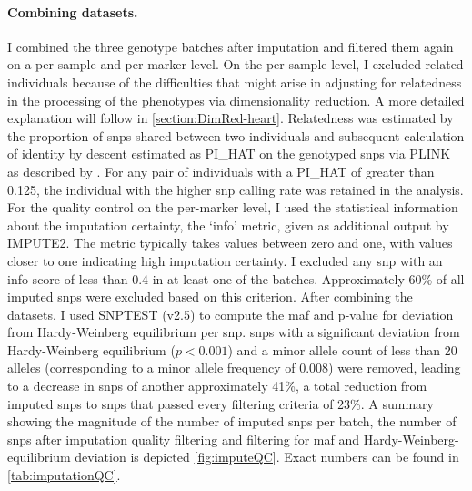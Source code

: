 \paragraph{Combining datasets.} I combined the three genotype batches after imputation and filtered them again on a per-sample and per-marker level. On the per-sample level, I excluded related individuals because of the difficulties that might arise in adjusting for relatedness in the processing of the phenotypes via dimensionality reduction. A more detailed explanation will follow in \cref{section:DimRed-heart}. Relatedness was estimated by the proportion of \glspl{snp} shared between two individuals and subsequent calculation of identity by descent estimated as PI\_HAT on the genotyped \glspl{snp} via PLINK as described by \citep{Anderson2010}. For any pair of individuals with a PI\_HAT of greater than \num{0.125}, the individual with the higher \gls{snp} calling rate was retained in the analysis. For the quality control on the per-marker level, I used the statistical information about the imputation certainty, the `info' metric,  given as additional output by IMPUTE2. The metric typically takes values between zero and one, with values closer to one indicating high imputation certainty. I excluded any \gls{snp} with an info score of less than \num{0.4} in at least one of the batches. Approximately \num{60}\% of all imputed \glspl{snp} were excluded based on this criterion.  After combining the datasets, I used SNPTEST (v2.5) \citep{Marchini2010} to compute the \gls{maf} and p-value for deviation from Hardy-Weinberg equilibrium per \gls{snp}. \glspl{snp} with a significant deviation from Hardy-Weinberg equilibrium (\(p <0.001\)) and a minor allele count of less than \num{20} alleles (corresponding to a minor allele frequency of \num{0.008}) were removed, leading to a decrease in \glspl{snp} of another approximately \num{41}\%, a total reduction from imputed \glspl{snp} to \glspl{snp} that passed every filtering criteria of \num{23}\%.  A summary showing the magnitude of the number of imputed \glspl{snp} per batch, the number of \glspl{snp} after imputation quality filtering and filtering for \gls{maf} and Hardy-Weinberg-equilibrium deviation is depicted \cref{fig:imputeQC}. Exact numbers can be found in \cref{tab:imputationQC}.

